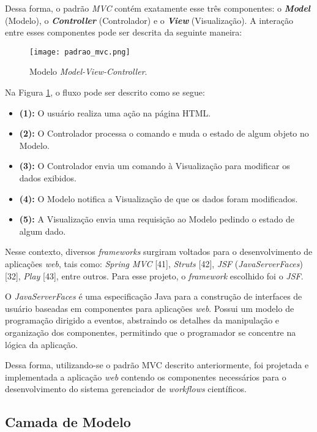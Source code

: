 Dessa forma, o padrão \textit{MVC} contém exatamente esse três componentes: o \textbf{\textit{Model}} (Modelo), o \textbf{\textit{Controller}} (Controlador) e o \textbf{\textit{View}} (Visualização). A interação entre esses componentes pode ser descrita da seguinte maneira:

\begin{figure}[H]
	\centering
	\texttt{[image: padrao\_mvc.png]}
	\caption{Modelo \textit{Model-View-Controller}.}
	\label{fig:padrao_mvc}
\end{figure}

Na Figura \ref{fig:padrao_mvc}, o fluxo pode ser descrito como se segue:

\begin{itemize}
 	\item \textbf{(1):} O usuário realiza uma ação na página HTML.
    \item \textbf{(2):} O Controlador processa o comando e muda o estado de algum objeto no Modelo.
    \item \textbf{(3):} O Controlador envia um comando à Visualização para modificar os dados exibidos.
    \item \textbf{(4):} O Modelo notifica a Visualização de que os dados foram modificados.
    \item \textbf{(5):} A Visualização envia uma requisição ao Modelo pedindo o estado de algum dado.
\end{itemize}

Nesse contexto, diversos \textit{frameworks} surgiram voltados para o desenvolvimento de aplicações \textit{web}, tais como: \textit{Spring MVC} [41], \textit{Struts} [42], \textit{JSF} (\textit{JavaServerFaces}) [32], \textit{Play} [43], entre outros. Para esse projeto, o \textit{framework} escolhido foi o \textit{JSF}.

O \textit{JavaServerFaces} é uma especificação Java para a construção de interfaces de usuário baseadas em componentes para aplicações \textit{web}. Possui um modelo de programação dirigido a eventos, abstraindo os detalhes da manipulação e organização dos componentes, permitindo que o programador se concentre na lógica da aplicação.

Dessa forma, utilizando-se o padrão MVC descrito anteriormente, foi projetada e implementada a aplicação \textit{web} contendo os componentes necessários para o desenvolvimento do sistema gerenciador de \textit{workflows} científicos. 

\subsection{Camada de Modelo} \label{cap5sec4subsec1}

